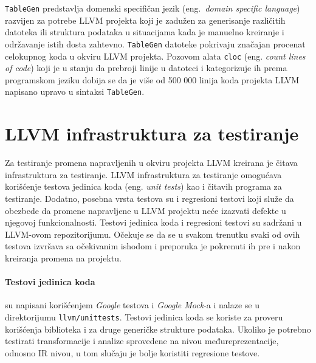 \documentclass[12pt,oneside]{memoir}
\begin{document}
\texttt{TableGen} predstavlja domenski specifičan jezik (eng.~\textit{domain specific language}) razvijen za potrebe LLVM projekta koji je zadužen za generisanje različitih datoteka ili struktura podataka u situacijama kada je manuelno kreiranje i održavanje istih dosta zahtevno. \texttt{TableGen} datoteke pokrivaju značajan procenat celokupnog koda u okviru LLVM projekta. Pozovom alata \texttt{cloc} (eng. \textit{count lines of code}) koji je u stanju da prebroji linije u datoteci i kategorizuje ih prema programskom jeziku dobija se da je više od 500 000 linija koda projekta LLVM napisano upravo u sintaksi \texttt{TableGen}. 

\section{LLVM infrastruktura za testiranje}

Za testiranje promena napravljenih u okviru projekta LLVM kreirana je čitava infrastruktura za testiranje. LLVM infrastruktura za testiranje omogućava korišćenje testova jedinica koda (eng. \textit{unit tests}) kao i čitavih programa za testiranje. Dodatno, posebna vrsta testova su i regresioni testovi koji služe da obezbede da promene napravljene u LLVM projektu neće izazvati defekte u njegovoj funkcionalnosti. Testovi jedinica koda i regresioni testovi su sadržani u LLVM-ovom repozitorijumu.
Očekuje se da se u svakom trenutku svaki od ovih testova izvršava sa očekivanim ishodom i preporuka je pokrenuti ih pre i nakon kreiranja promena na projektu.

\paragraph{Testovi jedinica koda} su napisani korišćenjem \textit{Google} testova i \textit{Google Mock}-a i nalaze se u direktorijumu \texttt{llvm/unittests}. Testovi jedinica koda se koriste za proveru korišćenja biblioteka i za druge generičke strukture podataka. Ukoliko je potrebno 
testirati transformacije i analize sprovedene na nivou međureprezentacije, odnosno IR nivou, u tom slučaju je bolje koristiti regresione testove.
\end{document}
